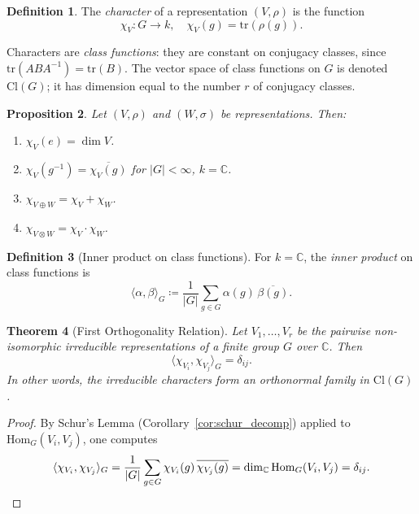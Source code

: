 \documentclass[12pt,a4paper]{amsart}
\newtheorem{theorem}{Theorem}[section]
\newtheorem{proposition}[theorem]{Proposition}
\theoremstyle{definition}
\newtheorem{definition}[theorem]{Definition}
\begin{document}
\begin{definition}
The \emph{character} of a representation $(V,\rho)$ is the function
\[
    \chi_V \colon G \longrightarrow k, \quad \chi_V(g) = \mathrm{tr}(\rho(g)).
\]
\end{definition}

Characters are \emph{class functions}: they are constant on conjugacy classes,
since $\mathrm{tr}(ABA^{-1}) = \mathrm{tr}(B)$.  The vector space of class
functions on $G$ is denoted $\mathrm{Cl}(G)$; it has dimension equal to the
number $r$ of conjugacy classes.

\begin{proposition}
\label{prop:char_props}
Let $(V,\rho)$ and $(W,\sigma)$ be representations.  Then:
\begin{enumerate}[label=\textup{(\roman*)}]
  \item $\chi_V(e) = \dim V$.
  \item $\chi_V(g^{-1}) = \overline{\chi_V(g)}$ for $|G| < \infty$, $k = \mathbb{C}$.
  \item $\chi_{V \oplus W} = \chi_V + \chi_W$.
  \item $\chi_{V \otimes W} = \chi_V \cdot \chi_W$.
\end{enumerate}
\end{proposition}

\begin{definition}[Inner product on class functions]
For $k = \mathbb{C}$, the \emph{inner product} on class functions is
\[
    \langle \alpha, \beta \rangle_G \coloneqq \frac{1}{|G|} \sum_{g \in G} \alpha(g)\,\overline{\beta(g)}.
\]
\end{definition}

\begin{theorem}[First Orthogonality Relation]
\label{thm:orth1}
Let $V_1,\ldots,V_r$ be the pairwise non-isomorphic irreducible representations
of a finite group $G$ over $\mathbb{C}$.  Then
\[
    \langle \chi_{V_i}, \chi_{V_j} \rangle_G = \delta_{ij}.
\]
In other words, the irreducible characters form an \emph{orthonormal} family in
$\mathrm{Cl}(G)$.
\end{theorem}

\begin{proof}
By Schur's Lemma (Corollary~\ref{cor:schur_decomp}) applied to
$\mathrm{Hom}_G(V_i, V_j)$, one computes
\[
    \langle \chi_{V_i}, \chi_{V_j} \rangle_G
    = \frac{1}{|G|} \sum_{g \in G} \chi_{V_i}(g)\,\overline{\chi_{V_j}(g)}
    = \dim_{\mathbb{C}} \mathrm{Hom}_G(V_i, V_j)
    = \delta_{ij}. \qedhere
\]
\end{proof}
\end{document}
